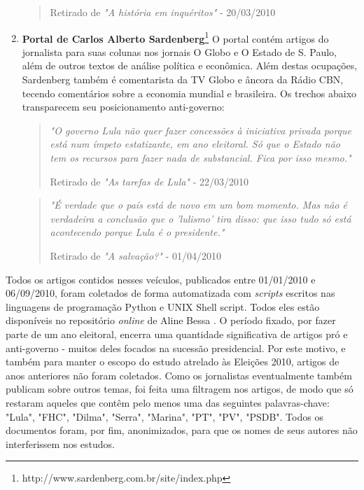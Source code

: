 \begin{enumerate}
\begin{quote}
{\small Retirado de \emph{"A história em inquéritos"} - 20/03/2010}
\end{quote}

\item \textbf{Portal de Carlos Alberto Sardenberg}\footnote{http://www.sardenberg.com.br/site/index.php} O portal contém artigos do jornalista para suas colunas nos jornais O Globo e O Estado de S. Paulo, além de outros textos de análise política e econômica. Além destas ocupações, Sardenberg também é comentarista da TV Globo e âncora da Rádio CBN, tecendo comentários sobre a economia mundial e brasileira. Os trechos abaixo transparecem seu posicionamento anti-governo: 

\begin{quote}

\emph{"O governo Lula não quer fazer concessões à iniciativa privada porque está num ímpeto estatizante, em ano eleitoral. Só que o Estado não tem os recursos para fazer nada de substancial. Fica por isso mesmo."}

{\small Retirado de \emph{"As tarefas de Lula"} - 22/03/2010}
\end{quote}

\begin{quote}

\emph{"É verdade que o país está de novo em um bom momento. Mas não é verdadeira a conclusão que o 'lulismo' tira disso: que isso tudo só está acontecendo porque Lula é o presidente."}

{\small Retirado de \emph{"A salvação?"} - 01/04/2010}
\end{quote}
\end{enumerate}

Todos os artigos contidos nesses veículos, publicados entre 01/01/2010 e 06/09/2010, foram coletados de forma automatizada com \emph{scripts} escritos nas linguagens de programação Python e UNIX Shell script. Todos eles estão disponíveis no repositório \emph{online} de Aline Bessa \cite{alibezz-github}. O período fixado, por fazer parte de um ano eleitoral, encerra uma quantidade significativa de artigos pró e anti-governo - muitos deles focados na sucessão presidencial. Por este motivo, e também para manter o escopo do estudo atrelado às Eleições 2010, artigos de anos anteriores não foram coletados. Como os jornalistas eventualmente também publicam sobre outros temas, foi feita uma filtragem nos artigos, de modo que só restaram aqueles que contêm pelo menos uma das seguintes palavras-chave: "Lula", "FHC", "Dilma", "Serra", "Marina", "PT", "PV", "PSDB". Todos os documentos foram, por fim, anonimizados, para que os nomes de seus autores não interferissem nos estudos. 

